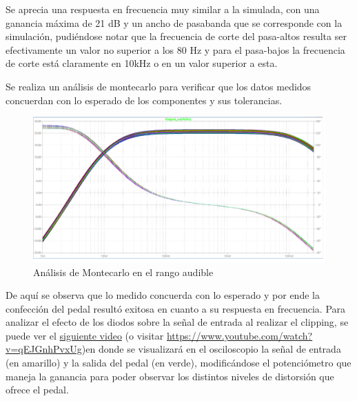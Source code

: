 \documentclass[../../main.tex]{subfiles}
\begin{document}
Se aprecia una respuesta en frecuencia muy similar a la simulada, con una ganancia máxima de 21 dB y un ancho de pasabanda que se corresponde con la simulación, pudiéndose notar que la frecuencia de corte del pasa-altos resulta ser efectivamente un valor no superior a los 80 Hz y para el pasa-bajos la frecuencia de corte está claramente en 10kHz o en un valor superior a esta. \par

Se realiza un análisis de montecarlo para verificar que los datos medidos concuerdan con lo esperado de los componentes y sus tolerancias. 

\begin{figure}[H]
	\centering
	\includegraphics[scale=.2]{imagenes/pedal_montecarlo.png}
	\caption{Análisis de Montecarlo en el rango audible}
	\label{fig:ej5_pedal_montecarlo}
\end{figure}
 
De aquí se observa que lo medido concuerda con lo esperado y por ende la confección del pedal resultó exitosa en cuanto a su respuesta en frecuencia. Para analizar el efecto de los diodos sobre la señal de entrada al realizar el clipping, se puede ver el  \href{https://www.youtube.com/watch?v=qEJGnhPvxUg}{siguiente video} (o visitar \url{https://www.youtube.com/watch?v=qEJGnhPvxUg})en donde se visualizará en el osciloscopio la señal de entrada (en amarillo) y la salida del pedal (en verde), modificándose el potenciómetro que maneja la ganancia para poder observar los distintos niveles de distorsión que ofrece el pedal.
\end{document}
